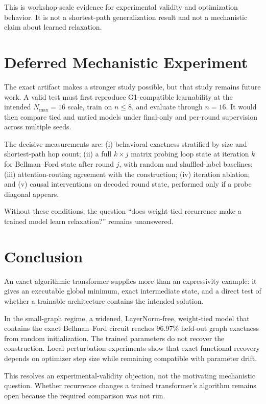 \documentclass[10pt,twocolumn]{article}
\newcommand{\gparity}{\textsc{G1}}
\begin{document}
This is workshop-scale evidence for experimental validity and optimization
behavior. It is not a shortest-path generalization result and not a
mechanistic claim about learned relaxation.

\section{Deferred Mechanistic Experiment}

The exact artifact makes a stronger study possible, but that study remains
future work. A valid test must first reproduce \gparity-compatible
learnability at the intended \(N_{\max}=16\) scale, train on \(n\le8\), and
evaluate through \(n=16\). It would then compare tied and untied models under
final-only and per-round supervision across multiple seeds.

The decisive measurements are: (i) behavioral exactness stratified by size and
shortest-path hop count; (ii) a full \(k\times j\) matrix probing loop state at
iteration \(k\) for Bellman--Ford state after round \(j\), with random and
shuffled-label baselines; (iii) attention-routing agreement with the
construction; (iv) iteration ablation; and (v) causal interventions on decoded
round state, performed only if a probe diagonal appears.

Without these conditions, the question ``does weight-tied recurrence make a
trained model learn relaxation?'' remains unanswered.

\section{Conclusion}

An exact algorithmic transformer supplies more than an expressivity example:
it gives an executable global minimum, exact intermediate state, and a direct
test of whether a trainable architecture contains the intended solution.

In the small-graph regime, a widened, LayerNorm-free, weight-tied model that
contains the exact Bellman--Ford circuit reaches 96.97\% held-out graph
exactness from random initialization. The trained parameters do not recover
the construction. Local perturbation experiments show that exact functional
recovery depends on optimizer step size while remaining compatible with
parameter drift.

This resolves an experimental-validity objection, not the motivating
mechanistic question. Whether recurrence changes a trained transformer's
algorithm remains open because the required comparison was not run.
\end{document}
